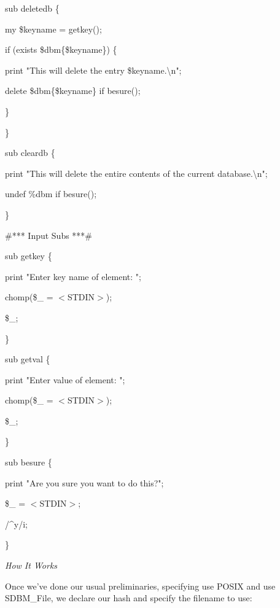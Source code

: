 \documentclass[a4paper,11pt]{book}
\begin{document}
\noindent sub deletedb \{

\noindent my \$keyname = getkey();

\noindent if (exists \$dbm\{\$keyname\}) \{

\noindent print "This will delete the entry \$keyname.\textbackslash n";

\noindent delete \$dbm\{\$keyname\} if besure();

\noindent \}

\noindent \}

\noindent 

\noindent sub cleardb \{

\noindent print "This will delete the entire contents of the current database.\textbackslash n";

\noindent undef \%dbm if besure();

\noindent \}

\noindent 

\noindent \#*** Input Subs ***\#

\noindent 

\noindent sub getkey \{

\noindent print "Enter key name of element: ";

\noindent chomp(\$\_  = $<$STDIN$>$);

\noindent \$\_;

\noindent \}

\noindent 

\noindent sub getval \{

\noindent print "Enter value of element: ";

\noindent chomp(\$\_  = $<$STDIN$>$);

\noindent \$\_;

\noindent \}

\noindent 

\noindent sub besure \{

\noindent print "Are you sure you want to do this?";

\noindent \$\_  = $<$STDIN$>$;

\noindent /\^{}y/i;

\noindent \}

\noindent 

\noindent \textit{How It Works}

\noindent Once we've done our usual preliminaries, specifying use POSIX and use SDBM\_File, we declare our hash and specify the filename to use:

\noindent 
\end{document}
